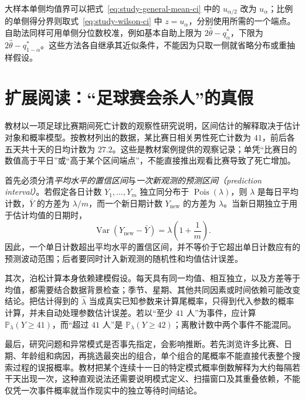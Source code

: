 大样本单侧均值界可以把式~\eqref{eq:study-general-mean-ci} 中的 $u_{\alpha/2}$ 改为 $u_\alpha$；比例的单侧得分界则取式~\eqref{eq:study-wilson-ci} 中 $z=u_\alpha$，分别使用所需的一个端点。自助法同样可用单侧分位数校准，例如基本自助上限为 $2\widehat\theta-q_\alpha^*$，下限为 $2\widehat\theta-q_{1-\alpha}^*$。这些方法各自继承其近似条件，不能因为只取一侧就省略分布或重抽样假设。

\section{扩展阅读：“足球赛会杀人”的真假}
\label{sec:study-football-claim}

教材以一项足球比赛期间死亡计数的观察性研究说明，区间估计的解释取决于估计对象和概率模型。按教材列出的数据，某比赛日相关男性死亡计数为 $41$，前后各五天共十天的日均计数为 $27.2$。这些是教材案例提供的观察记录；单凭“比赛日的数值高于平日”或“高于某个区间端点”，不能直接推出观看比赛导致了死亡增加。

首先必须分清\emph{平均水平的置信区间}与\emph{一次新观测的预测区间（prediction interval）}。若假定各日计数 $Y_1,\ldots,Y_m$ 独立同分布于 $\operatorname{Pois}(\lambda)$，则 $\lambda$ 是每日平均计数，$\bar Y$ 的方差为 $\lambda/m$，而一个新日期计数 $Y_{\mathrm{new}}$ 的方差为 $\lambda$。当新日期独立于用于估计均值的日期时，
\begin{equation}
  \operatorname{Var}(Y_{\mathrm{new}}-\bar Y)
   =\lambda\left(1+\frac1m\right).
  \label{eq:study-poisson-prediction-variance}
\end{equation}
因此，一个单日计数超出平均水平的置信区间，并不等价于它超出单日计数应有的预测波动范围；后者要同时计入新观测的随机性和均值估计误差。

其次，泊松计算本身依赖建模假设。每天具有同一均值、相互独立，以及方差等于均值，都需要结合数据背景检查；季节、星期、其他共同因素或时间依赖可能改变结论。把估计得到的 $\widehat\lambda$ 当成真实已知参数来计算尾概率，只得到代入参数的概率计算，并未自动处理参数估计误差。若以“至少 $41$ 人”为事件，应计算 $\mathbb P_\lambda(Y\ge41)$，而“超过 $41$ 人”是 $\mathbb P_\lambda(Y\ge42)$；离散计数中两个事件不能混同。

最后，研究问题和异常模式是否事先指定，会影响推断。若先浏览许多比赛、日期、年龄组和病因，再挑选最突出的组合，单个组合的尾概率不能直接代表整个搜索过程的误报概率。教材把某个连续十一日的特定模式概率倒数解释为大约每隔若干天出现一次，这种直观说法还需要说明模式定义、扫描窗口及其重叠依赖，不能仅凭一次事件概率就当作现实中的独立等待时间结论。

